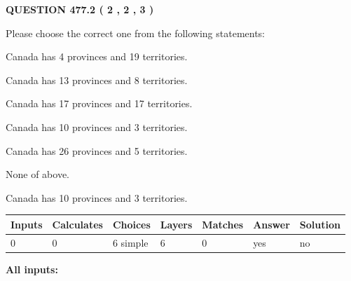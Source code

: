 \documentclass[12pt]{article}
\begin{document}
   
  
\vspace{0.2in}
  
{\textbf{\Large{QUESTION
477.2 
 ( 2 , 2 , 3 )
}}}
  
  
Please choose the correct one from the following statements:
 
 
Canada has   4 provinces and  19 territories.
 
 
Canada has  13 provinces and  8 territories.
 
 
Canada has  17 provinces and  17 territories.
 
 
Canada has 10  provinces and 3 territories.
 
 
Canada has  26 provinces and  5 territories.
 
 
 None of above.
 
 
\noindent{}
 
 
Canada has 10  provinces and 3 territories.
 
 
\noindent{}
 
 
   
   
   
   
\noindent\begin{tabular}{|l|l|l|l|l|l|l|}
 \hline
Inputs & Calculates & Choices & Layers & Matches & Answer & Solution \\ \hline
 0  & 
 0  & 
 6
  simple  
  & 
 6  & 
 0  & 
  yes & 
  no 
  \\ \hline
 \end{tabular}
   
   
   
   
\noindent{}
   
   
   
   
\noindent\vspace{0.1in}\hspace{-0.08in} {\textbf{\Large{All inputs: }}}
   
   
   
   
   
   
 \vspace{0.2in}
 
\end{document}
